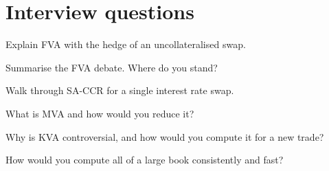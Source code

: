 \section{Interview questions}

\begin{interviewq}\label{iq:rc:funding-margin-and-capital-adjustments:1}
Explain FVA with the hedge of an uncollateralised swap.
\end{interviewq}

\begin{interviewq}\label{iq:rc:funding-margin-and-capital-adjustments:2}
Summarise the FVA debate. Where do you stand?
\end{interviewq}

\begin{interviewq}\label{iq:rc:funding-margin-and-capital-adjustments:3}
Walk through SA-CCR for a single interest rate swap.
\end{interviewq}

\begin{interviewq}\label{iq:rc:funding-margin-and-capital-adjustments:4}
What is MVA and how would you reduce it?
\end{interviewq}

\begin{interviewq}\label{iq:rc:funding-margin-and-capital-adjustments:5}
Why is KVA controversial, and how would you compute it for a new trade?
\end{interviewq}

\begin{interviewq}\label{iq:rc:funding-margin-and-capital-adjustments:6}
How would you compute all  of a large book consistently and fast?
\end{interviewq}
